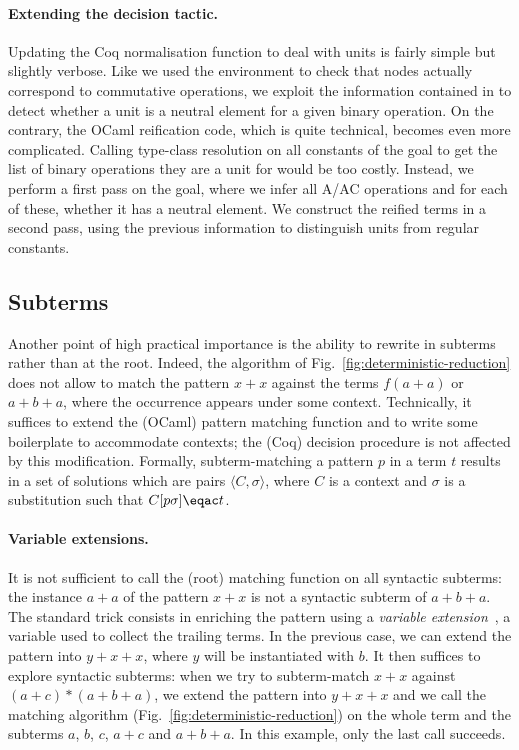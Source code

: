 \documentclass{llncs}
\begin{document}
\paragraph{Extending the decision tactic.}

Updating the Coq normalisation function to deal with units is fairly
simple but slightly verbose. Like we used the  environment
to check that  nodes actually correspond to commutative
operations, we exploit the information contained in  to
detect whether a unit is a neutral element for a given binary
operation.
On the contrary, the OCaml reification code, which is quite technical,
becomes even more complicated. Calling type-class resolution on all
constants of the goal to get the list of binary operations they are a
unit for would be too costly. Instead, we perform a first pass on the
goal, where we infer all A/AC operations and for each of these,
whether it has a neutral element. We construct the reified terms in a
second pass, using the previous information to distinguish units from
regular constants.

\subsection{Subterms}
\label{ssec:subterm} 

Another point of high practical importance is the ability to rewrite
in subterms rather than at the root.  Indeed, the algorithm of
Fig.~\ref{fig:deterministic-reduction} does not allow to match the
pattern $x+x$ against the terms $f(a+a)$ or $a+b+a$, where the
occurrence appears under some context. Technically, it suffices to
extend the (OCaml) pattern matching function and to write some
boilerplate to accommodate contexts; the (Coq) decision procedure is
not affected by this modification. Formally, subterm-matching a
pattern $p$ in a term $t$ results in a set of solutions which are
pairs $\langle C,\sigma\rangle$, where $C$ is a context and $\sigma$
is a substitution such that $C[p\sigma]\eqac t$.

\paragraph{Variable extensions.}

It is not sufficient to call the (root) matching function on all
syntactic subterms: the instance $a+a$ of the pattern $x+x$ is not a
syntactic subterm of $a+b+a$. The standard trick consists in enriching
the pattern using a \emph{variable
  extension}~\cite{PetersonS81:variable:extension,slind}, a variable
used to collect the trailing terms. In the previous case, we can
extend the pattern into $y+x+x$, where $y$ will be instantiated with
$b$.  It then suffices to explore syntactic subterms: when we try to
subterm-match $x+x$ against $(a+c)*(a+b+a)$, we extend the pattern
into $y+x+x$ and we call the matching algorithm
(Fig.~\ref{fig:deterministic-reduction}) on the whole term and the
subterms $a$, $b$, $c$, $a+c$ and $a+b+a$.  In this example, only the
last call succeeds.
\end{document}

